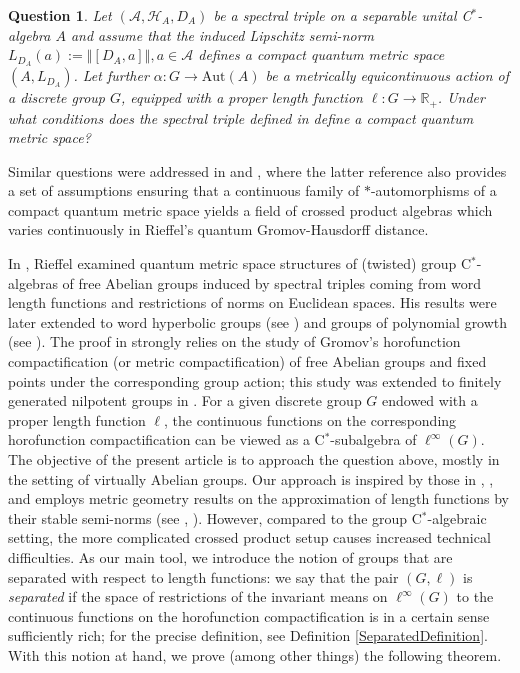 \documentclass[a4paper,11pt,reqno]{amsart}
\numberwithin{equation}{section}
\numberwithin{equation}{section}
\newtheorem*{question*}{Question}
\theoremstyle{definition}
\theoremstyle{remark}
\theoremstyle{remark}
\begin{document}
\begin{question*} \label{Question} Let $(\mathcal{A},\mathcal{H}_{A},D_{A})$
be a spectral triple on a separable unital C$^{\ast}$-algebra $A$
and assume that the induced Lipschitz semi-norm $L_{D_{A}}(a):=\left\Vert [D_{A},a]\right\Vert ,a\in\mathcal{A}$
defines a compact quantum metric space $(A,L_{D_{A}})$. Let further
$\alpha:G\rightarrow\text{Aut}(A)$ be a metrically equicontinuous
action of a discrete group $G$, equipped with a proper length function
$\ell:G\rightarrow\mathbb{R}_{+}$. Under what conditions does the
spectral triple defined in \cite{HSWZ13} define a compact quantum
metric space? \end{question*}
\noindent Similar questions were addressed in \cite{BMR10}
and \cite{KK21}, where the latter reference also provides a set of assumptions
ensuring that a continuous family of $\ast$-automorphisms of a compact
quantum metric space yields a field of crossed product algebras which
varies continuously in Rieffel's quantum Gromov-Hausdorff
distance.

In \cite{Rieffel02}, Rieffel examined quantum metric space structures
of (twisted) group C$^{\ast}$-algebras of free Abelian groups induced
by spectral triples coming from word length functions and restrictions
of norms on Euclidean spaces. His results were later extended to word
hyperbolic groups (see \cite{OzawaRieffel}) and groups of polynomial growth (see \cite{ChristRieffel}).
The proof in \cite{Rieffel02} strongly relies on the study of Gromov's
horofunction compactification (or metric compactification) of free
Abelian groups and fixed points under the corresponding group action;
this study was extended to finitely generated nilpotent groups in
\cite{Walsh07}. For a given discrete group $G$ endowed with a proper length
function $\ell$, the continuous functions on the corresponding horofunction
compactification can be viewed as a C$^{\ast}$-subalgebra of $\ell^{\infty}(G)$.
\\

The objective of the present article is to approach the question above,
mostly in the setting of virtually Abelian groups. Our approach is
inspired by those in \cite{Rieffel02}, \cite{OzawaRieffel}, and
employs metric geometry results on the approximation of length functions
by their stable semi-norms (see \cite{Burago}, \cite{LOZ21}). However,
compared to the group C$^{\ast}$-algebraic setting, the more complicated
crossed product setup causes increased technical difficulties. As
our main tool, we introduce the notion of groups that are separated
with respect to length functions: we say that the pair $(G,\ell)$
is \emph{separated} if the space of restrictions of the invariant means on
$\ell^{\infty}(G)$ to the continuous functions on the horofunction
compactification is in a certain sense sufficiently rich; for the
precise definition, see Definition \ref{SeparatedDefinition}. With this notion at hand, we
prove (among other things) the following theorem.
\end{document}

